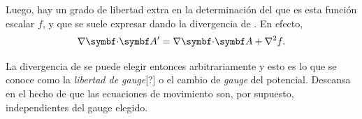 \documentclass[10pt,oneside]{CBFT_book}
\begin{document}
Luego, hay un grado de libertad extra en la determinación del  que es esta función escalar $f$, y que se suele expresar
dando la divergencia de . En efecto, 
\[
	\divem{A}' = \divem{A} + \nabla^2 f.
\]

La divergencia de  se puede elegir entonces arbitrariamente y esto es lo que se conoce como la {\it libertad de gauge}[?]
o el cambio de {\it gauge} del potencial. Descansa en el hecho de que las ecuaciones de movimiento son, por supuesto, independientes
del gauge elegido.




\end{document}
